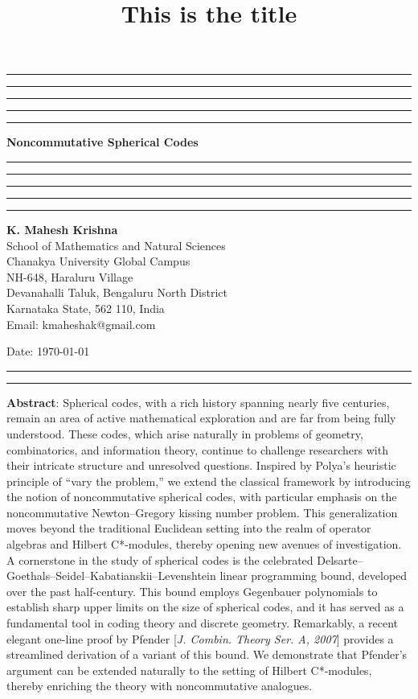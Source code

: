 \documentclass{amsart}
\title{This is the title}
\begin{document}
\hrule\hrule\hrule\hrule\hrule
\vspace{0.3cm}	
\begin{center}
{\bf{Noncommutative Spherical Codes}}\\
\vspace{0.3cm}
\hrule\hrule\hrule\hrule\hrule
\vspace{0.3cm}
\textbf{K. Mahesh Krishna}\\
School of Mathematics and Natural Sciences\\
Chanakya University Global Campus\\
NH-648, Haraluru Village\\
Devanahalli Taluk, 	Bengaluru  North District\\
Karnataka State, 562 110, India \\
Email: kmaheshak@gmail.com

Date: \today

\end{center}

\hrule\hrule
\vspace{0.5cm}

\textbf{Abstract}: Spherical codes, with a rich history spanning nearly five centuries, remain an area of active mathematical exploration and are far from being fully understood. These codes, which arise naturally in problems of geometry, combinatorics, and information theory, continue to challenge researchers with their intricate structure and unresolved questions. Inspired by Polya’s heuristic principle of “vary the problem,” we extend the classical framework by introducing the notion of noncommutative spherical codes, with particular emphasis on the noncommutative Newton–Gregory kissing number problem. This generalization moves beyond the traditional Euclidean setting into the realm of operator algebras and Hilbert C*-modules, thereby opening new avenues of investigation. A cornerstone in the study of spherical codes is the celebrated Delsarte–Goethals–Seidel–Kabatianskii–Levenshtein linear programming bound, developed over the past half-century. This bound employs Gegenbauer polynomials to establish sharp upper limits on the size of spherical codes, and it has served as a fundamental tool in coding theory and discrete geometry. Remarkably, a recent elegant one-line proof by Pfender [\textit{J. Combin. Theory Ser. A, 2007}] provides a streamlined derivation of a variant of this bound. We demonstrate that Pfender’s argument can be extended naturally to the setting of Hilbert C*-modules, thereby enriching the theory with noncommutative analogues.
\end{document}
